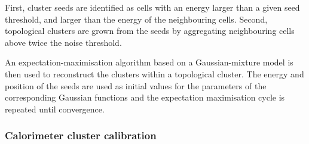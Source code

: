 First, cluster seeds are identified as cells with an energy larger than a given seed threshold, and larger than the energy of the neighbouring cells. Second, topological clusters are grown from the seeds by aggregating neighbouring cells above twice the noise threshold.

An expectation-maximisation algorithm based on a Gaussian-mixture model is then used to reconstruct the clusters within a topological cluster. The energy and position of the seeds are used as initial values for the parameters of the corresponding Gaussian functions and the expectation maximisation cycle is repeated until convergence.

\subsubsection{Calorimeter cluster calibration}

